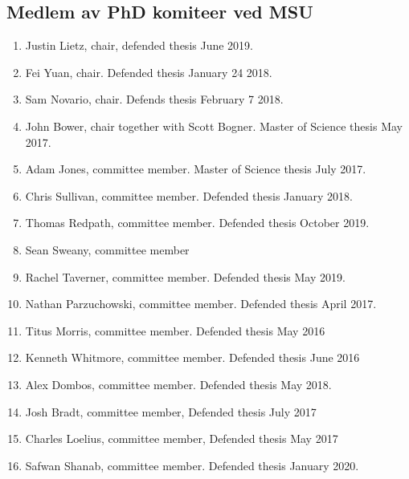 \documentclass[aps,floatfix,preprint]{revtex4-1}
\begin{document}
\subsection*{Medlem av PhD komiteer ved MSU}

\begin{enumerate}
\item Justin Lietz, chair, defended thesis June 2019.

\item Fei Yuan, chair.  Defended thesis January 24 2018.

\item Sam Novario, chair. Defends thesis February 7 2018.

\item John Bower, chair together with Scott Bogner. Master of Science thesis May 2017.  

\item Adam Jones, committee member. Master of Science thesis July 2017.  

\item Chris Sullivan, committee member. Defended thesis January 2018.

\item Thomas Redpath, committee member. Defended thesis October 2019.

\item Sean Sweany, committee member

\item Rachel Taverner, committee member. Defended thesis May 2019.

\item Nathan Parzuchowski, committee member. Defended thesis April 2017.

\item Titus Morris, committee member. Defended thesis May 2016

\item Kenneth Whitmore, committee member. Defended thesis June 2016

\item Alex Dombos, committee member. Defended thesis May 2018.

\item Josh Bradt, committee member, Defended thesis July 2017

\item Charles Loelius, committee member, Defended thesis May 2017

\item Safwan Shanab, committee member. Defended thesis January 2020.


\end{enumerate}
\end{document}
